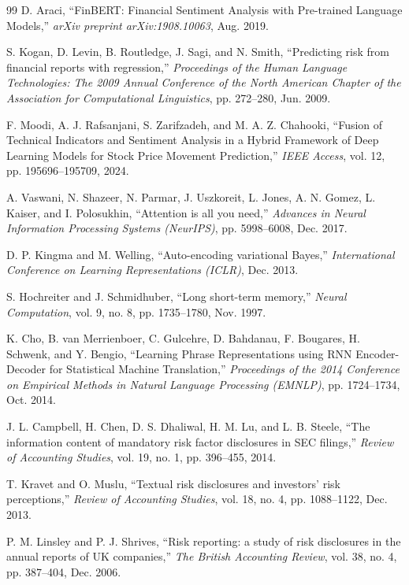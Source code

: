 \documentclass[journal]{IEEEtran}
\begin{document}
\begin{thebibliography}{99}
D. Araci, ``FinBERT: Financial Sentiment Analysis with Pre-trained Language Models,'' \textit{arXiv preprint arXiv:1908.10063}, Aug. 2019.

S. Kogan, D. Levin, B. Routledge, J. Sagi, and N. Smith, ``Predicting risk from financial reports with regression,'' \textit{Proceedings of the Human Language Technologies: The 2009 Annual Conference of the North American Chapter of the Association for Computational Linguistics}, pp. 272--280, Jun. 2009.

F. Moodi, A. J. Rafsanjani, S. Zarifzadeh, and M. A. Z. Chahooki, ``Fusion of Technical Indicators and Sentiment Analysis in a Hybrid Framework of Deep Learning Models for Stock Price Movement Prediction,'' \textit{IEEE Access}, vol. 12, pp. 195696--195709, 2024.

A. Vaswani, N. Shazeer, N. Parmar, J. Uszkoreit, L. Jones, A. N. Gomez, L. Kaiser, and I. Polosukhin, ``Attention is all you need,'' \textit{Advances in Neural Information Processing Systems (NeurIPS)}, pp. 5998--6008, Dec. 2017.

D. P. Kingma and M. Welling, ``Auto-encoding variational Bayes,'' \textit{International Conference on Learning Representations (ICLR)}, Dec. 2013.

S. Hochreiter and J. Schmidhuber, ``Long short-term memory,'' \textit{Neural Computation}, vol. 9, no. 8, pp. 1735--1780, Nov. 1997.

K. Cho, B. van Merrienboer, C. Gulcehre, D. Bahdanau, F. Bougares, H. Schwenk, and Y. Bengio, ``Learning Phrase Representations using RNN Encoder-Decoder for Statistical Machine Translation,'' \textit{Proceedings of the 2014 Conference on Empirical Methods in Natural Language Processing (EMNLP)}, pp. 1724--1734, Oct. 2014.

J. L. Campbell, H. Chen, D. S. Dhaliwal, H. M. Lu, and L. B. Steele, ``The information content of mandatory risk factor disclosures in SEC filings,'' \textit{Review of Accounting Studies}, vol. 19, no. 1, pp. 396--455, 2014.

T. Kravet and O. Muslu, ``Textual risk disclosures and investors' risk perceptions,'' \textit{Review of Accounting Studies}, vol. 18, no. 4, pp. 1088--1122, Dec. 2013.

P. M. Linsley and P. J. Shrives, ``Risk reporting: a study of risk disclosures in the annual reports of UK companies,'' \textit{The British Accounting Review}, vol. 38, no. 4, pp. 387--404, Dec. 2006.


\end{thebibliography}
\end{document}
